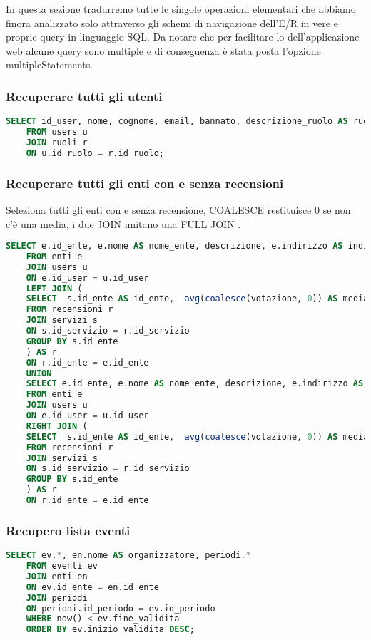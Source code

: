In questa sezione tradurremo tutte le singole operazioni elementari che abbiamo finora analizzato solo
attraverso gli schemi di navigazione dell’E/R in vere e proprie query in linguaggio SQL. 
Da notare che per facilitare lo dell'applicazione web alcune query sono multiple e di conseguenza è stata posta l'opzione multipleStatements.


\subsubsection{Recuperare tutti gli utenti}

\begin{lstlisting}[language=SQL]
	SELECT id_user, nome, cognome, email, bannato, descrizione_ruolo AS ruolo
	FROM users u
	JOIN ruoli r 
	ON u.id_ruolo = r.id_ruolo;
\end{lstlisting}

\subsubsection{Recuperare tutti gli enti con e senza recensioni}
Seleziona tutti gli enti con e senza recensione, COALESCE restituisce 0 se non c'è una media, i due JOIN imitano una FULL JOIN .
\begin{lstlisting}[language=SQL]
	SELECT e.id_ente, e.nome AS nome_ente, descrizione, e.indirizzo AS indirizzo_ente, numero_telefono, e.id_user, u.nome AS nome_user, cognome, email, cf, telefono, id_ruolo, media_recensioni
	FROM enti e
	JOIN users u
	ON e.id_user = u.id_user
	LEFT JOIN (
	SELECT  s.id_ente AS id_ente,  avg(coalesce(votazione, 0)) AS media_recensioni
	FROM recensioni r
	JOIN servizi s
	ON s.id_servizio = r.id_servizio
	GROUP BY s.id_ente
	) AS r
	ON r.id_ente = e.id_ente 
	UNION
	SELECT e.id_ente, e.nome AS nome_ente, descrizione, e.indirizzo AS indirizzo_ente, numero_telefono, e.id_user, u.nome AS nome_user, cognome, email, cf, telefono, id_ruolo, media_recensioni
	FROM enti e
	JOIN users u
	ON e.id_user = u.id_user
	RIGHT JOIN (
	SELECT  s.id_ente AS id_ente,  avg(coalesce(votazione, 0)) AS media_recensioni
	FROM recensioni r
	JOIN servizi s
	ON s.id_servizio = r.id_servizio
	GROUP BY s.id_ente
	) AS r
	ON r.id_ente = e.id_ente
\end{lstlisting}


\subsubsection{Recupero lista eventi}
\begin{lstlisting}[language=SQL]
	SELECT ev.*, en.nome AS organizzatore, periodi.*
	FROM eventi ev
	JOIN enti en
	ON ev.id_ente = en.id_ente
	JOIN periodi
	ON periodi.id_periodo = ev.id_periodo
	WHERE now() < ev.fine_validita
	ORDER BY ev.inizio_validita DESC;
\end{lstlisting}

